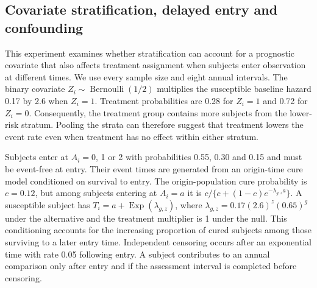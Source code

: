 \documentclass[12pt]{article}
\theoremstyle{definition}
\theoremstyle{remark}
\begin{document}
\subsection{Covariate stratification, delayed entry and confounding}
\label{sec:covariate-simulation}
This experiment examines whether stratification can account for a prognostic covariate that also affects treatment assignment when subjects enter observation at different times. We use every sample size and eight annual intervals. The binary covariate $Z_i\sim\operatorname{Bernoulli}(1/2)$ multiplies the susceptible baseline hazard 0.17 by 2.6 when $Z_i=1$. Treatment probabilities are 0.28 for $Z_i=1$ and 0.72 for $Z_i=0$. Consequently, the treatment group contains more subjects from the lower-risk stratum. Pooling the strata can therefore suggest that treatment lowers the event rate even when treatment has no effect within either stratum.

Subjects enter at $A_i=0$, 1 or 2 with probabilities 0.55, 0.30 and 0.15 and must be event-free at entry. Their event times are generated from an origin-time cure model conditioned on survival to entry. The origin-population cure probability is $c=0.12$, but among subjects entering at $A_i=a$ it is $c/\{c+(1-c)e^{-\lambda_{g,z}a}\}$. A susceptible subject has $T_i=a+\operatorname{Exp}(\lambda_{g,z})$, where $\lambda_{g,z}=0.17(2.6)^z(0.65)^g$ under the alternative and the treatment multiplier is 1 under the null. This conditioning accounts for the increasing proportion of cured subjects among those surviving to a later entry time. Independent censoring occurs after an exponential time with rate 0.05 following entry. A subject contributes to an annual comparison only after entry and if the assessment interval is completed before censoring.
\end{document}
